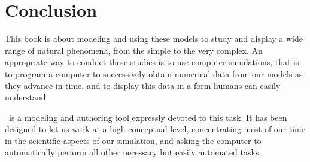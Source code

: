 \section{Conclusion}\label{section:02Review}

This book is about modeling and using these models to study and display a wide range
of natural phenomena, from the simple to the very complex. An appropriate way to conduct these studies is to use
computer simulations, that is to program a computer to successively obtain numerical data from our models as they advance
in time, and to display this data in a form humans can easily understand.

\Ejs\ is a modeling and authoring tool expressly devoted to this task. It has been designed to let us work at a high
conceptual level, concentrating most of our time in the scientific aspects of our simulation, and asking the computer
to automatically perform all other necessary but easily automated tasks.
